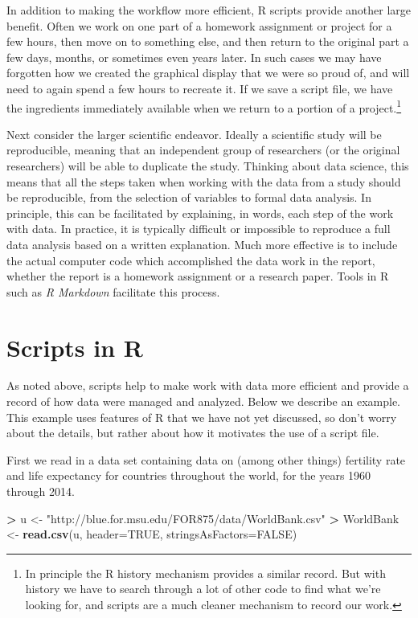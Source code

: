 \documentclass[]{krantz}
\makeatletter
\newenvironment{Shaded}{\begin{snugshade}}{\end{snugshade}}
\newcommand{\KeywordTok}[1]{\textcolor[rgb]{0.27,0.27,0.27}{\textbf{#1}}}
\newcommand{\DataTypeTok}[1]{\textcolor[rgb]{0.27,0.27,0.27}{#1}}
\newcommand{\StringTok}[1]{\textcolor[rgb]{0.5,0.5,0.5}{#1}}
\newcommand{\OtherTok}[1]{\textcolor[rgb]{0.37,0.37,0.37}{#1}}
\newcommand{\OperatorTok}[1]{\textcolor[rgb]{0.43,0.43,0.43}{\textbf{#1}}}
\newcommand{\NormalTok}[1]{#1}
\newenvironment{kframe}{%
\medskip{}
\setlength{\fboxsep}{.8em}
 \def\at@end@of@kframe{}%
 \ifinner\ifhmode%
  \def\at@end@of@kframe{\end{minipage}}%
  \begin{minipage}{\columnwidth}%
 \fi\fi%
 \def\FrameCommand##1{\hskip\@totalleftmargin \hskip-\fboxsep
 \colorbox{shadecolor}{##1}\hskip-\fboxsep
     \hskip-\linewidth \hskip-\@totalleftmargin \hskip\columnwidth}%
 \MakeFramed {\advance\hsize-\width
   \@totalleftmargin\z@ \linewidth\hsize
   \@setminipage}}%
 {\par\unskip\endMakeFramed%
 \at@end@of@kframe}
\renewenvironment{Shaded}{\begin{kframe}}{\end{kframe}}
\makeatother
\begin{document}
In addition to making the workflow more efficient, R scripts provide
another large benefit. Often we work on one part of a homework
assignment or project for a few hours, then move on to something else,
and then return to the original part a few days, months, or sometimes
even years later. In such cases we may have forgotten how we created the
graphical display that we were so proud of, and will need to again spend
a few hours to recreate it. If we save a script file, we have the
ingredients immediately available when we return to a portion of a
project.\footnote{In principle the R history mechanism provides a
  similar record. But with history we have to search through a lot of
  other code to find what we're looking for, and scripts are a much
  cleaner mechanism to record our work.}

Next consider the larger scientific endeavor. Ideally a scientific study
will be reproducible, meaning that an independent group of researchers
(or the original researchers) will be able to duplicate the study.
Thinking about data science, this means that all the steps taken when
working with the data from a study should be reproducible, from the
selection of variables to formal data analysis. In principle, this can
be facilitated by explaining, in words, each step of the work with data.
In practice, it is typically difficult or impossible to reproduce a full
data analysis based on a written explanation. Much more effective is to
include the actual computer code which accomplished the data work in the
report, whether the report is a homework assignment or a research paper.
Tools in R such as \emph{R Markdown} facilitate this process.

\section{Scripts in R}\label{scripts-in-r}

As noted above, scripts help to make work with data more efficient and
provide a record of how data were managed and analyzed. Below we
describe an example. This example uses features of R that we have not
yet discussed, so don't worry about the details, but rather about how it
motivates the use of a script file.

First we read in a data set containing data on (among other things)
fertility rate and life expectancy for countries throughout the world,
for the years 1960 through 2014.

\begin{Shaded}
\begin{Highlighting}[]
\OperatorTok{>}\StringTok{ }\NormalTok{u <-}\StringTok{ "http://blue.for.msu.edu/FOR875/data/WorldBank.csv"}
\OperatorTok{>}\StringTok{ }\NormalTok{WorldBank <-}\StringTok{ }\KeywordTok{read.csv}\NormalTok{(u, }\DataTypeTok{header=}\OtherTok{TRUE}\NormalTok{, }\DataTypeTok{stringsAsFactors=}\OtherTok{FALSE}\NormalTok{)}
\end{Highlighting}
\end{Shaded}
\end{document}
